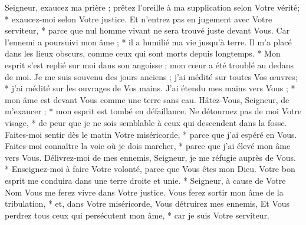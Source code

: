  Seigneur, exaucez ma prière ; prêtez l'oreille à ma supplication selon Votre vérité; * exaucez-moi selon Votre justice.
\versseparator
 Et n'entrez pas en jugement avec Votre serviteur, * parce que nul homme vivant ne sera trouvé juste devant Vous.
\versseparator
 Car l'ennemi a poursuivi mon âme ; * il a humilié ma vie jusqu'à terre.
\versseparator
 Il m'a placé dans les lieux obscurs, comme ceux qui sont morts depuis longtemps. * Mon esprit s'est replié sur moi dans son angoisse ; mon cœur a été troublé au dedans de moi.
\versseparator
 Je me suis souvenu des jours anciens ; j'ai médité sur toutes Vos œuvres; * j'ai médité sur les ouvrages de Vos mains.
\versseparator
 J'ai étendu mes mains vers Vous ; * mon âme est devant Vous comme une terre sans eau.
\versseparator
 Hâtez-Vous, Seigneur, de m'exaucer ; * mon esprit est tombé en défaillance.
\versseparator
 Ne détournez pas de moi Votre visage, * de peur que je ne sois semblable à ceux qui descendent dans la fosse.
\versseparator
 Faites-moi sentir dès le matin Votre miséricorde, * parce que j'ai espéré en Vous.
\versseparator
 Faites-moi connaître la voie où je dois marcher, * parce que j'ai élevé mon âme vers Vous.
\versseparator
 Délivrez-moi de mes ennemis, Seigneur, je me réfugie auprès de Vous. * Enseignez-moi à faire Votre volonté, parce que Vous êtes mon Dieu.
\versseparator
 Votre bon esprit me conduira dans une terre droite et unie. * Seigneur, à cause de Votre Nom Vous me ferez vivre dans Votre justice.
\versseparator
 Vous ferez sortir mon âme de la tribulation, * et, dans Votre miséricorde, Vous détruirez mes ennemis,
\versseparator
 Et Vous perdrez tous ceux qui persécutent mon âme, * car je suis Votre serviteur.